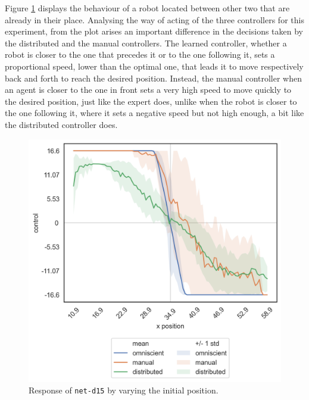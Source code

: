 Figure \ref{fig:net-d15responseposition} displays the behaviour of a robot 
located between other two that are already in their place.
Analysing the way of acting of the three controllers for this experiment, from 
the plot arises an important difference in the decisions taken by the distributed 
and the manual controllers.
The learned controller, whether a robot is closer to the one that precedes it 
or to the one following it, sets a proportional speed, lower than the optimal one, 
that leads it to move respectively back and forth to reach the desired position.
Instead, the manual controller when an agent is closer to the one in front 
sets a very high speed to move quickly to the desired position, just like the expert 
does, unlike when the robot is closer to the one following it, where it sets a 
negative speed but not high enough, a bit like the distributed controller does.
\begin{figure}[!htb]
	\centering
	\includegraphics[width=.45\textwidth]{contents/images/net-d15/response-varying_init_position-distributed}%
	\caption{Response of \texttt{net-d15} by varying the initial position.}
	\label{fig:net-d15responseposition}
\end{figure}

